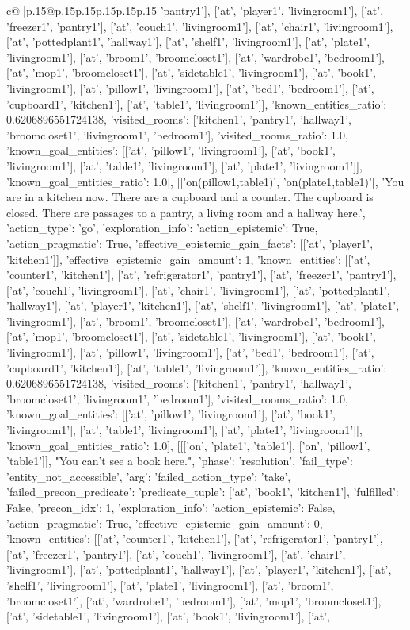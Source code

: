 \documentclass{article}
\begin{document}
{\begin{supertabular}{c@{$\;$}|p{.15\linewidth}@{}p{.15\linewidth}p{.15\linewidth}p{.15\linewidth}p{.15\linewidth}p{.15\linewidth}}
{{{'pantry1'], ['at', 'player1', 'livingroom1'], ['at', 'freezer1', 'pantry1'], ['at', 'couch1', 'livingroom1'], ['at', 'chair1', 'livingroom1'], ['at', 'pottedplant1', 'hallway1'], ['at', 'shelf1', 'livingroom1'], ['at', 'plate1', 'livingroom1'], ['at', 'broom1', 'broomcloset1'], ['at', 'wardrobe1', 'bedroom1'], ['at', 'mop1', 'broomcloset1'], ['at', 'sidetable1', 'livingroom1'], ['at', 'book1', 'livingroom1'], ['at', 'pillow1', 'livingroom1'], ['at', 'bed1', 'bedroom1'], ['at', 'cupboard1', 'kitchen1'], ['at', 'table1', 'livingroom1']], 'known_entities_ratio': 0.6206896551724138, 'visited_rooms': ['kitchen1', 'pantry1', 'hallway1', 'broomcloset1', 'livingroom1', 'bedroom1'], 'visited_rooms_ratio': 1.0, 'known_goal_entities': [['at', 'pillow1', 'livingroom1'], ['at', 'book1', 'livingroom1'], ['at', 'table1', 'livingroom1'], ['at', 'plate1', 'livingroom1']], 'known_goal_entities_ratio': 1.0}}], [['on(pillow1,table1)', 'on(plate1,table1)'], 'You are in a kitchen now. There are a cupboard and a counter. The cupboard is closed. There are passages to a pantry, a living room and a hallway here.', {'action_type': 'go', 'exploration_info': {'action_epistemic': True, 'action_pragmatic': True, 'effective_epistemic_gain_facts': [['at', 'player1', 'kitchen1']], 'effective_epistemic_gain_amount': 1, 'known_entities': [['at', 'counter1', 'kitchen1'], ['at', 'refrigerator1', 'pantry1'], ['at', 'freezer1', 'pantry1'], ['at', 'couch1', 'livingroom1'], ['at', 'chair1', 'livingroom1'], ['at', 'pottedplant1', 'hallway1'], ['at', 'player1', 'kitchen1'], ['at', 'shelf1', 'livingroom1'], ['at', 'plate1', 'livingroom1'], ['at', 'broom1', 'broomcloset1'], ['at', 'wardrobe1', 'bedroom1'], ['at', 'mop1', 'broomcloset1'], ['at', 'sidetable1', 'livingroom1'], ['at', 'book1', 'livingroom1'], ['at', 'pillow1', 'livingroom1'], ['at', 'bed1', 'bedroom1'], ['at', 'cupboard1', 'kitchen1'], ['at', 'table1', 'livingroom1']], 'known_entities_ratio': 0.6206896551724138, 'visited_rooms': ['kitchen1', 'pantry1', 'hallway1', 'broomcloset1', 'livingroom1', 'bedroom1'], 'visited_rooms_ratio': 1.0, 'known_goal_entities': [['at', 'pillow1', 'livingroom1'], ['at', 'book1', 'livingroom1'], ['at', 'table1', 'livingroom1'], ['at', 'plate1', 'livingroom1']], 'known_goal_entities_ratio': 1.0}}], [[['on', 'plate1', 'table1'], ['on', 'pillow1', 'table1']], "You can't see a book here.", {'phase': 'resolution', 'fail_type': 'entity_not_accessible', 'arg': {'failed_action_type': 'take', 'failed_precon_predicate': {'predicate_tuple': ['at', 'book1', 'kitchen1'], 'fulfilled': False, 'precon_idx': 1}}, 'exploration_info': {'action_epistemic': False, 'action_pragmatic': True, 'effective_epistemic_gain_amount': 0, 'known_entities': [['at', 'counter1', 'kitchen1'], ['at', 'refrigerator1', 'pantry1'], ['at', 'freezer1', 'pantry1'], ['at', 'couch1', 'livingroom1'], ['at', 'chair1', 'livingroom1'], ['at', 'pottedplant1', 'hallway1'], ['at', 'player1', 'kitchen1'], ['at', 'shelf1', 'livingroom1'], ['at', 'plate1', 'livingroom1'], ['at', 'broom1', 'broomcloset1'], ['at', 'wardrobe1', 'bedroom1'], ['at', 'mop1', 'broomcloset1'], ['at', 'sidetable1', 'livingroom1'], ['at', 'book1', 'livingroom1'], ['at', }}}
\end{supertabular}}
\end{document}
